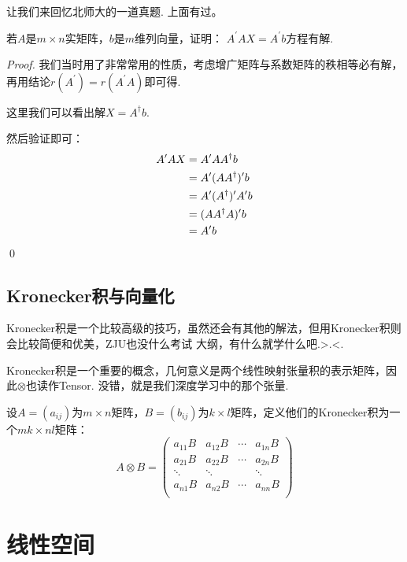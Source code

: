 让我们来回忆北师大的一道真题. 上面有过。

\begin{ex}[北师大 2020]
	若$A$是$m \times n$实矩阵，$b$是$m$维列向量，证明： $A^\prime AX = A^\prime b$方程有解.
\end{ex}

\begin{proof}
	我们当时用了非常常用的性质，考虑增广矩阵与系数矩阵的秩相等必有解，再用结论$r(A^\prime) = r(A^\prime A)$即可得.

	这里我们可以看出解$X=A^\dagger b$.

	然后验证即可：
	\begin{align*}
		A^{\prime} A X &= A^{\prime} A A^\dagger b \\
		&= A^{\prime} (A A^\dagger)^\prime b \\
		&= A^{\prime} (A^{\dagger})^{\prime} A^{\prime} b\\
		&= (A A^\dagger A)^{\prime} b \\
		&= A^\prime b 
	\end{align*}
	\qed{}
\end{proof}

\section*{Kronecker积与向量化}

Kronecker积是一个比较高级的技巧，虽然还会有其他的解法，但用Kronecker积则会比较简便和优美，ZJU也没什么考试
大纲，有什么就学什么吧.>.<. 

Kronecker积是一个重要的概念，几何意义是两个线性映射张量积的表示矩阵，因此$\otimes$也读作Tensor.
没错，就是我们深度学习中的那个张量.

\begin{definition}
	设$A=(a_{ij})$为$m \times n$矩阵，$B=(b_{ij})$为$k\times l$矩阵，定义他们的Kronecker积为一个$mk \times nl$矩阵：
	$$
	A \otimes B =  
	\begin{pmatrix}
		a_{11}B & a_{12}B & \cdots & a_{1n}B \\
		a_{21}B & a_{22}B & \cdots & a_{2n}B \\
		\ddots & \ddots & & \ddots \\
		a_{n1}B & a_{n2}B & \cdots & a_{nn}B \\
	\end{pmatrix}
	$$ 
\end{definition}

\chapter{线性空间}

